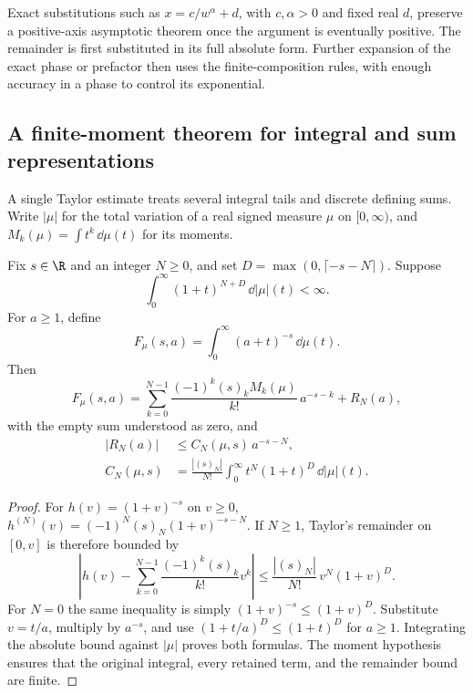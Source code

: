Exact substitutions such as $x=c/w^\alpha+d$, with $c,\alpha>0$ and
fixed real $d$, preserve a positive-axis asymptotic theorem once the
argument is eventually positive. The remainder is first substituted
in its full absolute form. Further expansion of the exact phase or
prefactor then uses the finite-composition rules, with enough accuracy
in a phase to control its exponential.

\subsection{A finite-moment theorem for integral and sum representations}

A single Taylor estimate treats several integral tails and discrete
defining sums. Write $|\mu|$ for the total variation of a real signed
measure $\mu$ on $[0,\infty)$, and
$M_k(\mu)=\int t^k\,\dd\mu(t)$ for its moments.

\begin{theorem}
\label{thm:special-function-moment-expansion}
Fix $s\in\R$ and an integer $N\ge0$, and set
$D=\max(0,\lceil-s-N\rceil)$. Suppose
\[
 \int_0^\infty(1+t)^{N+D}\,\dd|\mu|(t)<\infty.
\]
For $a\ge1$, define
\[
 F_\mu(s,a)=\int_0^\infty(a+t)^{-s}\,\dd\mu(t).
\]
Then
\begin{equation}
 F_\mu(s,a)=
 \sum_{k=0}^{N-1}\frac{(-1)^k(s)_kM_k(\mu)}{k!}\,a^{-s-k}
       +R_N(a),
 \label{eq:special-function-moment-expansion}
\end{equation}
with the empty sum understood as zero, and
\begin{equation}
\begin{aligned}
 |R_N(a)|&\le C_N(\mu,s)\,a^{-s-N},\\
 C_N(\mu,s)&=
  \frac{|(s)_N|}{N!}
       \int_0^\infty t^N(1+t)^D\,\dd|\mu|(t).
\end{aligned}
\label{eq:special-function-moment-bound}
\end{equation}
\end{theorem}
\begin{proof}
For $h(v)=(1+v)^{-s}$ on $v\ge0$,
$h^{(N)}(v)=(-1)^N(s)_N(1+v)^{-s-N}$. If $N\ge1$,
Taylor's remainder on $[0,v]$ is therefore bounded by
\[
 \left|h(v)-\sum_{k=0}^{N-1}
                \frac{(-1)^k(s)_k}{k!}v^k\right|
       \le \frac{|(s)_N|}{N!}\,v^N(1+v)^D.
\]
For $N=0$ the same inequality is simply
$(1+v)^{-s}\le(1+v)^D$.
Substitute $v=t/a$, multiply by $a^{-s}$, and use
$(1+t/a)^D\le(1+t)^D$ for $a\ge1$. Integrating the absolute
bound against $|\mu|$ proves both formulas. The moment hypothesis
ensures that the original integral, every retained term, and the
remainder bound are finite.
\end{proof}

